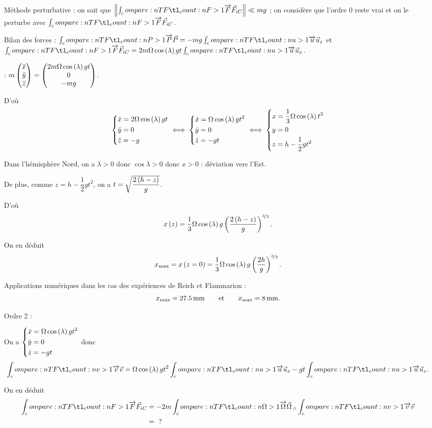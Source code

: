 Méthode perturbative : on sait que \(\norme{\v{F}_{iC}}\ll mg\) ; on considère que l'ordre 0 reste vrai et on le perturbe avec \(\v{F}_{iC}\).

Bilan des forces : \(\v{P}=-mg\v{u}_z\) et \(\v{F}_{iC}=2m\Omega\cos\paren{\lambda}gt\v{u}_x\).

\PFD : \(m\begin{pmatrix}\ddot{x}\\\ddot{y}\\\ddot{z}\end{pmatrix}=\begin{pmatrix}2m\Omega\cos\left(\lambda\right)gt\\0\\-mg\end{pmatrix}\).

D'où \[\begin{dcases}
\ddot{x}=2\Omega\cos\left(\lambda\right)gt \\
\ddot{y}=0 \\
\ddot{z}=-g
\end{dcases}\iff\begin{dcases}
\dot{x}=\Omega\cos\left(\lambda\right)gt^2 \\
\dot{y}=0 \\
\dot{z}=-gt
\end{dcases}\iff\begin{dcases}
x=\dfrac{1}{3}\Omega\cos\left(\lambda\right)t^3 \\
y=0 \\
z=h-\dfrac{1}{2}gt^2
\end{dcases}\]

Dans l'hémisphère Nord, on a \(\lambda>0\) donc \(\cos\lambda>0\) donc \(x>0\) : déviation vers l'Est.

De plus, comme \(z=h-\dfrac{1}{2}gt^2\), on a \(t=\sqrt{\dfrac{2\left(h-z\right)}{g}}\).

D'où \[x\left(z\right)=\dfrac{1}{3}\Omega\cos\left(\lambda\right)g\left(\dfrac{2\left(h-z\right)}{g}\right)^{\nicefrac{3}{2}}.\]

On en déduit \[x_{\mathrm{max}}=x\left(z=0\right)=\dfrac{1}{3}\Omega\cos\left(\lambda\right)g\left(\dfrac{2h}{g}\right)^{\nicefrac{3}{2}}.\]

Applications numériques dans les cas des expériences de Reich et Flammarion : \[x_{\mathrm{max}}=\SI{27.5}{\milli\metre}\qquad\text{et}\qquad x_{\mathrm{max}}=\SI{8}{\milli\metre}.\]

Ordre 2 :

On a \(\begin{dcases}
\dot{x}=\Omega\cos\left(\lambda\right)gt^2 \\
\dot{y}=0 \\
\dot{z}=-gt
\end{dcases}\) donc \[\v{v}=\Omega\cos\paren{\lambda}gt^2\v{u}_x-gt\v{u}_z.\]

On en déduit \[\begin{aligned}
\v{F}_{iC}&=-2m\v{\Omega}\vecto\v{v} \\
&=\text{ }?
\end{aligned}\]

